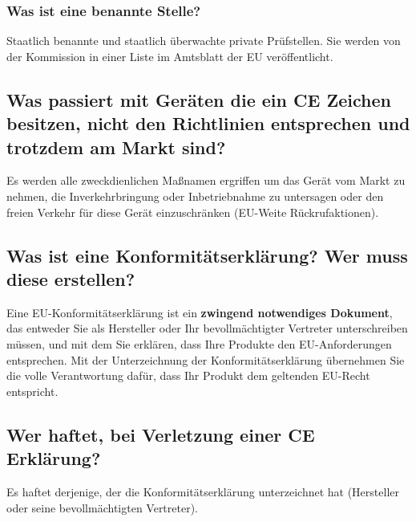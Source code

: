 \subsubsection{Was ist eine benannte Stelle?}
Staatlich benannte und staatlich überwachte private Prüfstellen.\p
Sie werden von der Kommission in einer Liste im Amtsblatt der EU veröffentlicht.

\subsection{Was passiert mit Geräten die ein CE Zeichen besitzen, nicht den Richtlinien entsprechen und trotzdem am Markt sind?}
Es werden alle zweckdienlichen Maßnamen ergriffen um das Gerät vom Markt zu nehmen, die Inverkehrbringung oder Inbetriebnahme zu untersagen oder den freien Verkehr für diese Gerät einzuschränken (EU-Weite Rückrufaktionen).

\subsection{Was ist eine Konformitätserklärung? Wer muss diese erstellen?}
Eine EU-Konformitätserklärung ist ein \textbf{zwingend notwendiges Dokument}, das entweder Sie als Hersteller oder Ihr bevollmächtigter Vertreter unterschreiben müssen, und mit dem Sie erklären, dass Ihre Produkte den EU-Anforderungen entsprechen. Mit der Unterzeichnung der Konformitätserklärung übernehmen Sie die volle Verantwortung dafür, dass Ihr Produkt dem geltenden EU-Recht entspricht.

\subsection{Wer haftet, bei Verletzung einer CE Erklärung?}
Es haftet derjenige, der die Konformitätserklärung unterzeichnet hat (Hersteller oder seine bevollmächtigten Vertreter).